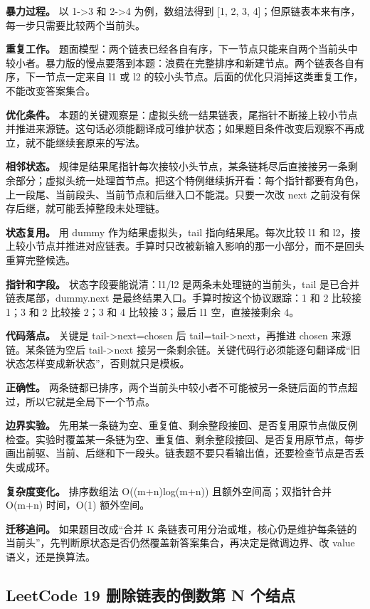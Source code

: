 \textbf{暴力过程。} 以 1->3 和 2->4 为例，数组法得到 [1, 2, 3, 4]；但原链表本来有序，每一步只需要比较两个当前头。

\textbf{重复工作。} 题面模型：两个链表已经各自有序，下一节点只能来自两个当前头中较小者。暴力版的慢点要落到本题：浪费在完整排序和新建节点。两个链表各自有序，下一节点一定来自 l1 或 l2 的较小头节点。后面的优化只消掉这类重复工作，不能改变答案集合。

\textbf{优化条件。} 本题的关键观察是：虚拟头统一结果链表，尾指针不断接上较小节点并推进来源链。这句话必须能翻译成可维护状态；如果题目条件改变后观察不再成立，就不能继续套原来的写法。

\textbf{相邻状态。} 规律是结果尾指针每次接较小头节点，某条链耗尽后直接接另一条剩余部分；虚拟头统一处理首节点。把这个特例继续拆开看：每个指针都要有角色，上一段尾、当前段头、当前节点和后继入口不能混。只要一次改 next 之前没有保存后继，就可能丢掉整段未处理链。

\textbf{状态复用。} 用 dummy 作为结果虚拟头，tail 指向结果尾。每次比较 l1 和 l2，接上较小节点并推进对应链表。手算时只改被新输入影响的那一小部分，而不是回头重算完整候选。

\textbf{指针和字段。} 状态字段要能说清：l1/l2 是两条未处理链的当前头，tail 是已合并链表尾部，dummy.next 是最终结果入口。手算时按这个协议跟踪：1 和 2 比较接 1；3 和 2 比较接 2；3 和 4 比较接 3；最后 l1 空，直接接剩余 4。

\textbf{代码落点。} 关键是 tail->next=chosen 后 tail=tail->next，再推进 chosen 来源链。某条链为空后 tail->next 接另一条剩余链。关键代码行必须能逐句翻译成“旧状态怎样变成新状态”，否则就只是模板。

\textbf{正确性。} 两条链都已排序，两个当前头中较小者不可能被另一条链后面的节点超过，所以它就是全局下一个节点。

\textbf{边界实验。} 先用某一条链为空、重复值、剩余整段接回、是否复用原节点做反例检查。实验时覆盖某一条链为空、重复值、剩余整段接回、是否复用原节点，每步画出前驱、当前、后继和下一段头。链表题不要只看输出值，还要检查节点是否丢失或成环。

\textbf{复杂度变化。} 排序数组法 O((m+n)log(m+n)) 且额外空间高；双指针合并 O(m+n) 时间，O(1) 额外空间。

\textbf{迁移追问。} 如果题目改成“合并 K 条链表可用分治或堆，核心仍是维护每条链的当前头”，先判断原状态是否仍然覆盖新答案集合，再决定是微调边界、改 value 语义，还是换算法。

\subsection{LeetCode 19 删除链表的倒数第 N 个结点}

